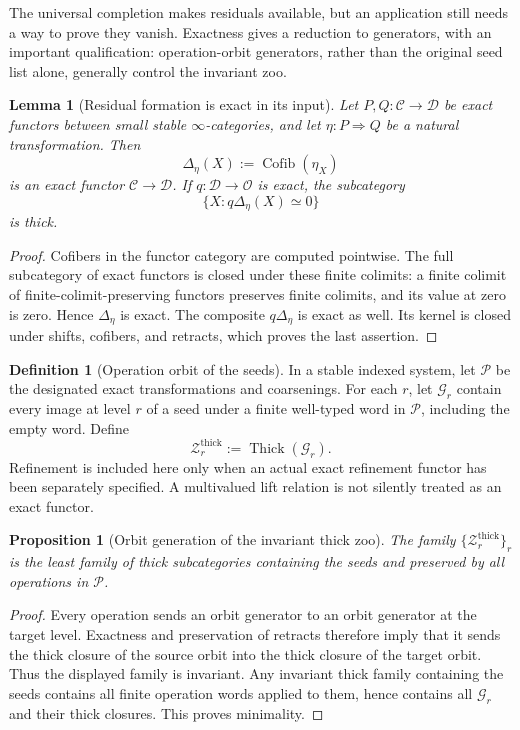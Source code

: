 \documentclass[11pt]{article}
\newtheorem{proposition}[theorem]{Proposition}
\newtheorem{lemma}[theorem]{Lemma}
\theoremstyle{definition}
\newtheorem{definition}[theorem]{Definition}
\theoremstyle{remark}
\newcommand{\Cofib}{\operatorname{Cofib}}
\begin{document}
The universal completion makes residuals available, but an application still needs a way to prove they vanish. Exactness gives a reduction to generators, with an important qualification: operation-orbit generators, rather than the original seed list alone, generally control the invariant zoo.

\begin{lemma}[Residual formation is exact in its input]\label{lem:exact-residual-functor}
Let $P,Q:\mathcal C\to\mathcal D$ be exact functors between small stable $\infty$-categories, and let $\eta:P\Rightarrow Q$ be a natural transformation. Then
\[
\Delta_\eta(X):=\Cofib(\eta_X)
\]
is an exact functor $\mathcal C\to\mathcal D$. If $q:\mathcal D\to\mathcal O$ is exact, the subcategory
\[
\{X:q\Delta_\eta(X)\simeq0\}
\]
is thick.
\end{lemma}

\begin{proof}
Cofibers in the functor category are computed pointwise. The full subcategory of exact functors is closed under these finite colimits: a finite colimit of finite-colimit-preserving functors preserves finite colimits, and its value at zero is zero. Hence $\Delta_\eta$ is exact. The composite $q\Delta_\eta$ is exact as well. Its kernel is closed under shifts, cofibers, and retracts, which proves the last assertion.
\end{proof}

\begin{definition}[Operation orbit of the seeds]
In a stable indexed system, let $\mathscr P$ be the designated exact transformations and coarsenings. For each $r$, let $\mathcal G_r$ contain every image at level $r$ of a seed under a finite well-typed word in $\mathscr P$, including the empty word. Define
\[
\mathcal Z_r^{\mathrm{thick}}:=\operatorname{Thick}(\mathcal G_r).
\]
Refinement is included here only when an actual exact refinement functor has been separately specified. A multivalued lift relation is not silently treated as an exact functor.
\end{definition}

\begin{proposition}[Orbit generation of the invariant thick zoo]\label{prop:orbit-zoo}
The family $\{\mathcal Z_r^{\mathrm{thick}}\}_r$ is the least family of thick subcategories containing the seeds and preserved by all operations in $\mathscr P$.
\end{proposition}

\begin{proof}
Every operation sends an orbit generator to an orbit generator at the target level. Exactness and preservation of retracts therefore imply that it sends the thick closure of the source orbit into the thick closure of the target orbit. Thus the displayed family is invariant. Any invariant thick family containing the seeds contains all finite operation words applied to them, hence contains all $\mathcal G_r$ and their thick closures. This proves minimality.
\end{proof}
\end{document}
